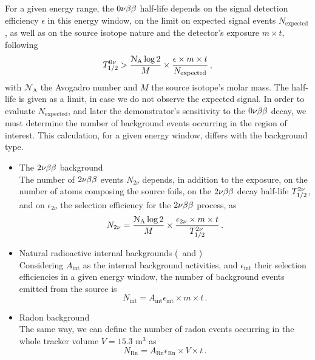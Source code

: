 For a given energy range, the $0\nu\beta\beta$ half-life depends on the signal detection efficiency $\epsilon$ in this energy window, on the limit on expected signal events $N_{\text{expected}}$, as well as on the source isotope nature and the detector's exposure $m\times t$, following
\begin{equation}
  T_{1/2}^{0\nu} > \frac{\mathcal{N}_{\text{A}}\log{2}}{M}\times \frac{\epsilon\times m\times t}{N_{\text{expected}}}\,,
  \label{eq:tbeta_limit}
\end{equation}
with $\mathcal{N}_{\text{A}}$ the Avogadro number and $M$ the source isotope's molar mass.
The half-life is given as a limit, in case we do not observe the expected signal.
In order to evaluate $N_{\text{expected}}$, and later the demonstrator's sensitivity to the $0\nu\beta\beta$ decay, we must determine the number of background events occurring in the region of interest.
This calculation, for a given energy window, differs with the background type.
\begin{itemize}
\item The $2\nu\beta\beta$ background\\
  The number of $2\nu\beta\beta$ events $N_{2\nu}$ depends, in addition to the exposure, on the number of atoms composing the source foils, on the $2\nu\beta\beta$ decay half-life $T_{1/2}^{2\nu}$, and on $\epsilon_{2\nu}$ the selection efficiency for the $2\nu\beta\beta$ process, as
  \begin{equation}
    N_{2\nu} = \frac{\mathcal{N}_{\text{A}}\log{2}}{M}\times\frac{\epsilon_{2\nu}\times m\times t}{T_{1/2}^{2\nu}}\,.
  \end{equation}
\item Natural radioactive internal backgrounds (\Tl\ and \Bi)\\
  Considering $A_{\text{int}}$ as the internal background activities, and $\epsilon_{\text{int}}$ their selection efficiencies in a given energy window, the number of background events emitted from the source is
  \begin{equation}
    N_{\text{int}} = A_{\text{int}}\epsilon_{\text{int}}\times m\times t\,.
  \end{equation}
\item Radon background\\
  The same way, we can define the number of radon events occurring in the whole tracker volume $V = 15.3$ m$^{3}$ as
  \begin{equation}
    N_{\text{Rn}} = A_{\text{Rn}}\epsilon_{\text{Rn}}\times V\times t\,.
  \end{equation}
\end{itemize}
